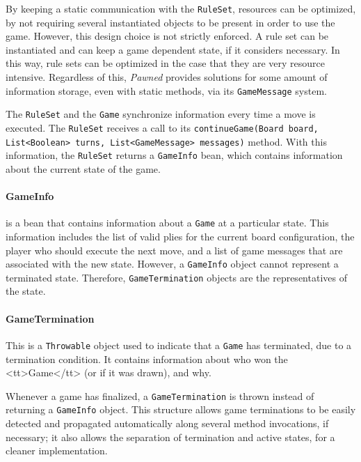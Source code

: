 					By keeping a static communication with the \texttt{RuleSet}, resources can be optimized, by not
					requiring several instantiated objects to be present in order to use the game. However,
					this design choice is not strictly enforced. A rule set can be instantiated and can keep a game
					dependent state, if it considers necessary. In this way, rule sets can be optimized 
					in the case that they are very resource intensive. Regardless of this, \emph{Pawned}
					provides solutions for some amount of information storage, even with static methods, via 
					its \texttt{GameMessage} system.  
									
					The \texttt{RuleSet} and the \texttt{Game} synchronize information every time a move is executed. 
					The \texttt{RuleSet} receives a call to its 
					\texttt{continueGame(Board board, List<Boolean> turns, List<GameMessage> messages)} method.
					With this information, the \texttt{RuleSet} returns a \texttt{GameInfo} bean, which 
					contains information about the current state of the game. 

					\paragraph{GameInfo} is a bean that contains information about a \texttt{Game} at a particular
					state. This information includes the list of valid plies for the current board configuration, the
					player who should execute the next move, and a list of game messages that are associated with the new 
					state. However, a \texttt{GameInfo} object cannot represent a terminated state. Therefore, 
					\texttt{GameTermination} objects are the representatives of the state. 					

					\paragraph{GameTermination} This is a \texttt{Throwable} object used to indicate that a \texttt{Game}
					has terminated, due to a termination condition. It contains information about who won the <tt>Game</tt>
					(or if it was drawn), and why.
					
					Whenever a game has finalized, a \texttt{GameTermination} is thrown instead of returning 
					a \texttt{GameInfo} object. This structure allows game terminations to be easily detected and 
					propagated automatically along several method invocations, if necessary; it also allows 
					the separation of termination and active states, for a cleaner implementation. 
					  
